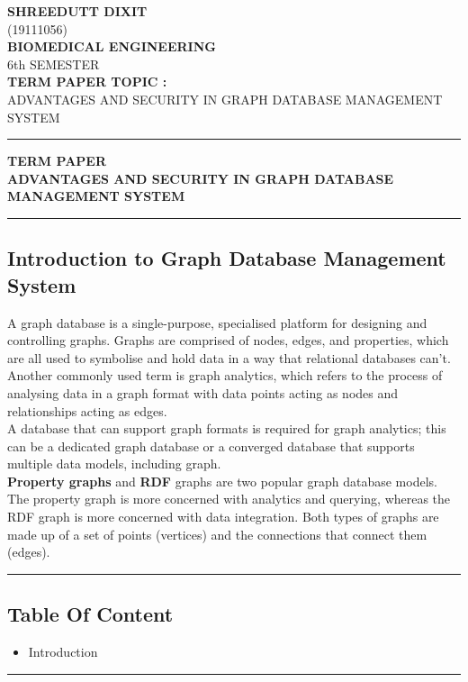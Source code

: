 \documentclass[12pt,a4paper]{article}
\begin{document}
    \vspace*{\fill}
    \begin{center}
        \Huge
        \textbf{SHREEDUTT DIXIT}
        \\
        \Large
        (19111056)
        \\
        \textbf{BIOMEDICAL ENGINEERING}
        \\
        6th SEMESTER
        \\
        \Large
        \textbf{TERM PAPER TOPIC :}
        \\
        \large
        ADVANTAGES AND SECURITY IN GRAPH DATABASE MANAGEMENT SYSTEM
    \end{center}
    \vspace*{\fill}
    \pagebreak
    
    \hrule \medskip 
    \begin{center}
        \large 
    \textbf{TERM PAPER}\\
    \normalsize 
    \textbf{ADVANTAGES AND SECURITY IN GRAPH DATABASE MANAGEMENT SYSTEM}\\ 
    \end{center}
    
    \medskip\hrule
    \bigskip
    
    \begin{center}
    \subsection*{Introduction to Graph Database Management System}
    \end{center}
    
    A graph database is a single-purpose, specialised platform for designing and controlling graphs. Graphs are comprised of nodes, edges, and properties, which are all used to symbolise and hold data in a way that relational databases can't.
    \\
    Another commonly used term is graph analytics, which refers to the process of analysing data in a graph format with data points acting as nodes and relationships acting as edges.
    \\
    A database that can support graph formats is required for graph analytics; this can be a dedicated graph database or a converged database that supports multiple data models, including graph.
    \\
    \textbf{Property graphs} and \textbf{RDF} graphs are two popular graph database models.
    \\
    The property graph is more concerned with analytics and querying, whereas the RDF graph is more concerned with data integration. Both types of graphs are made up of a set of points (vertices) and the connections that connect them (edges).
\pagebreak

\rule{\textwidth}{1pt}
    \begin{center}
    \section* {Table Of Content}
        \end{center}
  \begin{itemize}
    \item Introduction
  \end{itemize}

  \rule{\textwidth}{1pt}
  
\pagebreak
\end{document}
